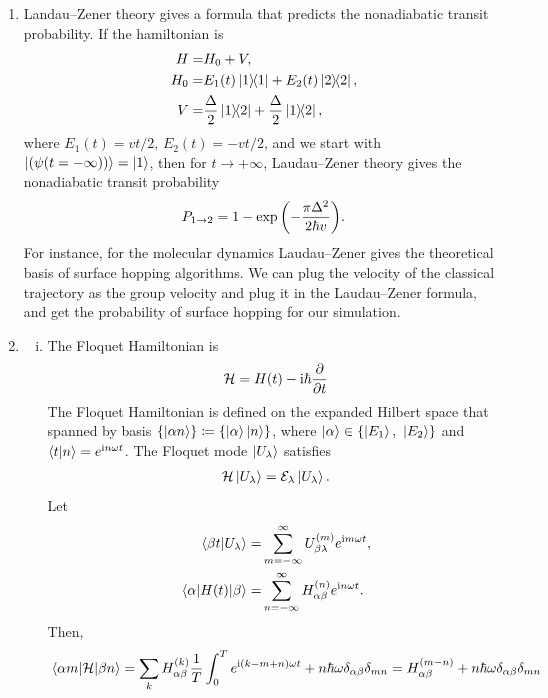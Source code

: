 \documentclass{article}
\newcommand{\iu}{\ensuremath{\mathrm{i}}}
\newcommand{\set}[1]{\ensuremath{\left\{{#1}\right\}}}
\begin{document}
\begin{enumerate}[1.]
  \item Landau--Zener theory gives a formula that predicts the nonadiabatic transit probability. If the hamiltonian is
  \begin{align*}
    H =& H_0 + V, \\
    H_0 =& E_1(t)\op{1} + E_2(t)\op{2}, \\
    V =& \frac{\Delta}{2}\op{1}{2} + \frac{\Delta}{2}\op{1}{2},
  \end{align*}
  where $E_1(t) = vt/2$, $E_2(t) = -vt/2$,  and we start with $\ket{(\psi(t=-\infty))} = \ket{1}$, then for $t \to +\infty$, Laudau--Zener theory gives the nonadiabatic transit probability
  \begin{align*}
    P_{1\to 2} = 1-\exp\qty(-\frac{\pi\Delta^2}{2\hbar v}).
  \end{align*}
  For instance, for the molecular dynamics Laudau--Zener gives the theoretical basis of surface hopping algorithms.
  We can plug the velocity of the classical trajectory as the group velocity and plug it in the Laudau--Zener formula, and get the probability of surface hopping for our simulation.
  \item
  \begin{enumerate}[(i)]
    \item The Floquet Hamiltonian is
    \begin{align*}
      \mathcal{H} = H(t) - \iu\hbar\pdv{t}
    \end{align*}
    The Floquet Hamiltonian is defined on the expanded Hilbert space that spanned by basis $\set{\ket{\alpha n}} \coloneqq \set{\ket{\alpha}\ket{n}}$, where $\ket{\alpha} \in \set{\ket{E_1},\ \ket{E_2}}$ and $\ip{t}{n} = e^{\iu n \omega t}$. 
    The Floquet mode $\ket{U_\lambda}$ satisfies
    \begin{align*}
      \mathcal{H} \ket{U_\lambda} = \mathcal{E}_\lambda \ket{U_\lambda}.
    \end{align*}
    Let
    \begin{align*}
      {\ip{\beta t}{U_\lambda}} =& \sum_{m=-\infty}^\infty U_{\beta\lambda}^{(m)}e^{\iu m \omega t},\\
      \mel{\alpha}{H(t)}{\beta} =& \sum_{n = -\infty}^{\infty} H_{\alpha\beta}^{(n)}e^{\iu n \omega t}.
    \end{align*}
    Then,
    \begin{align*}
      {\mel{\alpha m }{\mathcal{H}}{\beta n}} = \sum_k H_{\alpha\beta}^{(k)} \frac{1}{T}\int_0^T e^{\iu (k-m+n) \omega t} + n\hbar\omega\delta_{\alpha\beta}\delta_{mn} = H_{\alpha\beta}^{(m-n)} + n\hbar\omega\delta_{\alpha\beta}\delta_{mn} 

\end{align*}
\end{enumerate}
\end{enumerate}
\end{document}

